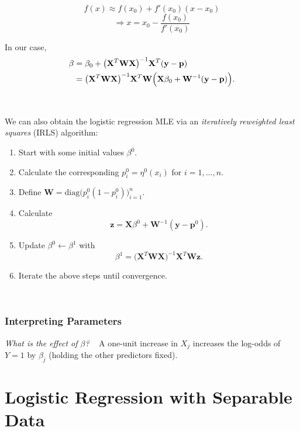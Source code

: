 \documentclass[
]{book}
\begin{document}
~

\[f(x) \approx f(x_0) + f'(x_0) (x-x_0) \]
\[\Longrightarrow x = x_0 - \frac{f(x_0)}{f'(x_0)}\]

In our case,
\begin{align*}
\beta &= \beta_0 + \bigl(\mathbf{X}^T \mathbf{W} \mathbf{X}\bigr)^{-1} \mathbf{X}^T (\mathbf{y}-\mathbf{p})\\
&=  \bigl(\mathbf{X}^T \mathbf{W} \mathbf{X}\bigr)^{-1} \mathbf{X}^T \mathbf{W}
\Bigl( \mathbf{X} \beta_0 + \mathbf{W}^{-1}(\mathbf{y} - \mathbf{p}) \Bigr).
\end{align*}

~~

We can also obtain the logistic regression MLE via an \emph{iteratively reweighted least squares} (IRLS) algorithm:

\begin{enumerate}
\def\labelenumi{\arabic{enumi}.}
\item
  Start with some initial values \(\beta^0\).
\item
  Calculate the corresponding \(p_i^0 = \eta^0 (x_i)\) for \(i=1, \ldots, n\).
\item
  Define \(\mathbf{W} = \mathrm{diag}\bigl(p_i^0(1-p_i^0)\bigr)_{i=1}^{n}\).
\item
  Calculate
  \[\mathbf{z} = \mathbf{X} \beta^0 + \mathbf{W}^{-1}(\mathbf{y} - \mathbf{p}^0).\]
  \smallskip
\item
  Update \(\beta^0 \leftarrow \beta^1\) with
  \[\beta^1 = \bigl(\mathbf{X}^T \mathbf{W} \mathbf{X}\bigr)^{-1} \mathbf{X}^T \mathbf{W} \mathbf{z}.\]
\item
  Iterate the above steps until convergence.
\end{enumerate}

~~

\subsubsection*{Interpreting Parameters}\label{interpreting-parameters}

\emph{What is the effect of \(\beta\)?}
~
A one-unit increase in \(X_j\) increases the log-odds of \(Y=1\) by \(\beta_j\) (holding the other predictors fixed).

\section{Logistic Regression with Separable Data}\label{logistic-regression-with-separable-data}
\end{document}
